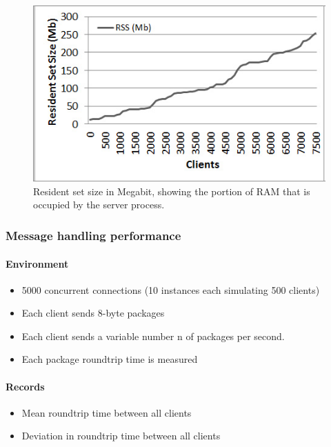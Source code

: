 \documentclass[12pt]{article}
\begin{document}
\begin{center}
\begin{figure}
\includegraphics[scale=0.75]{test_CLIENT_RSS.jpg}
\caption{Resident set size in Megabit, showing the portion of RAM that is occupied by the server process.}
\end{figure}

\end{center}


\subsubsection{Message handling performance}
\paragraph{Environment}
\begin{itemize}
\item 5000 concurrent connections (10 instances each simulating 500 clients)
\item Each client sends 8-byte packages
\item Each client sends a variable number n of packages per second.
\item Each package roundtrip time is measured
\end{itemize}

\paragraph{Records}
\begin{itemize}
\item Mean roundtrip time between all clients
\item Deviation in roundtrip time between all clients
\end{itemize}
\end{document}
